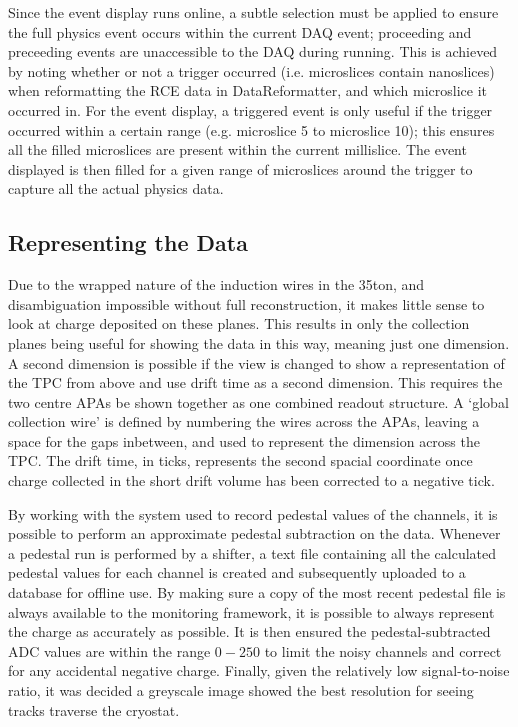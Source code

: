 Since the event display runs online, a subtle selection must be applied to ensure the full physics event occurs within the current DAQ event; proceeding and preceeding events are unaccessible to the DAQ during running.  This is achieved by noting whether or not a trigger occurred (i.e. microslices contain nanoslices) when reformatting the RCE data in DataReformatter, and which microslice it occurred in.  For the event display, a triggered event is only useful if the trigger occurred within a certain range (e.g. microslice 5 to microslice 10); this ensures all the filled microslices are present within the current millislice.  The event displayed is then filled for a given range of microslices around the trigger to capture all the actual physics data.

\subsection{Representing the Data}\label{RepresentingEVDData}

Due to the wrapped nature of the induction wires in the 35ton, and disambiguation impossible without full reconstruction, it makes little sense to look at charge deposited on these planes.  This results in only the collection planes being useful for showing the data in this way, meaning just one dimension.  A second dimension is possible if the view is changed to show a representation of the TPC from above and use drift time as a second dimension.  This requires the two centre APAs be shown together as one combined readout structure.  A `global collection wire' is defined by numbering the wires across the APAs, leaving a space for the gaps inbetween, and used to represent the dimension across the TPC.  The drift time, in ticks, represents the second spacial coordinate once charge collected in the short drift volume has been corrected to a negative tick.

By working with the system used to record pedestal values of the channels, it is possible to perform an approximate pedestal subtraction on the data.  Whenever a pedestal run is performed by a shifter, a text file containing all the calculated pedestal values for each channel is created and subsequently uploaded to a database for offline use.  By making sure a copy of the most recent pedestal file is always available to the monitoring framework, it is possible to always represent the charge as accurately as possible.  It is then ensured the pedestal-subtracted ADC values are within the range $0-250$ to limit the noisy channels and correct for any accidental negative charge.  Finally, given the relatively low signal-to-noise ratio, it was decided a greyscale image showed the best resolution for seeing tracks traverse the cryostat.

